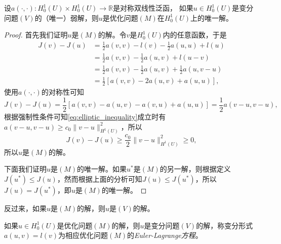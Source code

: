 \documentclass[a4paper,10pt]{ctexart}
\begin{document}
\begin{lemma}
    设$ a(\cdot,\cdot):H^1_0(U)\times H^1_0(U)\to \mathbb{R} $是对称双线性泛函， 如果$ u\in H^1_0(U) $是变分问题$ (V) $的（唯一）弱解，则$ u $是优化问题$ (M) $在$ H^1_0(U) $上的唯一解。
\end{lemma}
\begin{proof}
    首先我们证明$ u $是$ (M) $的解。令$ v $是$ H^1_0(U) $内的任意函数，于是
    \[
        \begin{aligned}
            J(v) - J(u) &= \frac{1}{2}a(v,v) - l(v) - \frac{1}{2}a(u,u) + l(u)\\
            &= \frac{1}{2}a(v,v) - \frac{1}{2}a(u,v) + l(u-v)\\
            &= \frac{1}{2}a(v,v) - \frac{1}{2}a(u,v) +\frac{1}{2}a(u,v-u)\\
            &= \frac{1}{2}[a(v,v)-2a(u,v)+a(u,u)],
        \end{aligned}
    \]
    使用$ a(\cdot,\cdot) $的对称性可知
    \[
        J(v) - J(u) = \frac{1}{2}[a(v,v)-a(u,v) - a(v,u)+a(u,u)] = \frac{1}{2}a(v-u,v-u),
    \]
    根据强制性条件可知\eqref{eq:elliptic_inequality}成立时有$ a(v-u,v-u) \geqslant c_0\| v-u \|_{H^1(U)}^2 $，所以
    \[
        J(v) - J(u) \geqslant \frac{c_0}{2}\| v-u \|_{H^1(U)}^2 \geqslant 0,
    \]
    所以$ u $是$ (M) $的解。

    下面我们证明$ u $是$ (M) $的唯一解。如果$ u^* $是$ (M) $的另一解，则根据定义$ J(u^*) \leqslant J(u) $，然而根据上面的分析可知$ J(u) \leqslant J(u^*) $，所以$ J(u) = J(u^*) $，即$ u $是$ (M) $的唯一解。
\end{proof}
反过来，如果$ u $是$ (M) $的解，则$ u $是$ (V) $的解。
\begin{lemma}
    如果$ u\in H^1_0(U) $是优化问题$ (M) $的解，则$ u $是变分问题$ (V) $的解，称变分形式$ a(u,v)=l(v) $为相应优化问题$ (M) $的\emph{Euler-Lagrange方程}。
\end{lemma}
\end{document}
